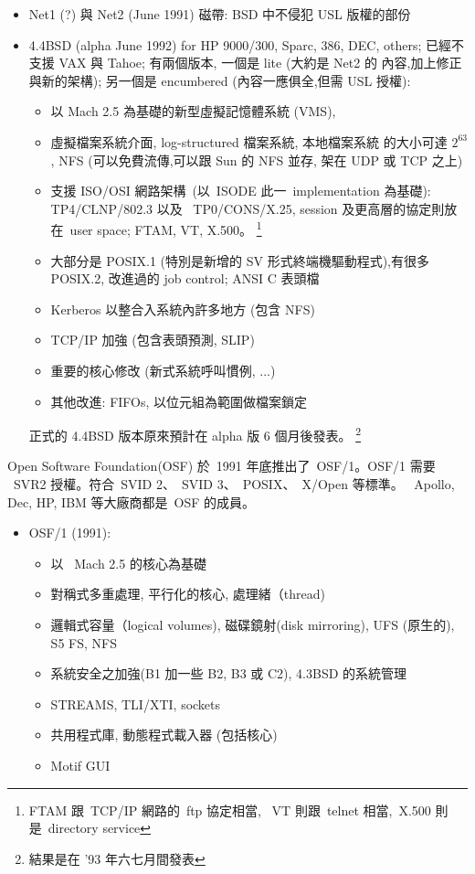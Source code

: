 \documentclass{article}
\begin{document}
\begin{CJK*}{Bg5}{ming}
\begin{itemize}
         \item Net1 (?) 與 Net2 (June 1991) 磁帶: BSD 中不侵犯 USL 版權的部份

         \item 4.4BSD (alpha June 1992) for HP 9000/300, Sparc, 386, DEC, others;
           已經不支援 VAX 與 Tahoe; 有兩個版本, 一個是 lite (大約是 Net2 的
           內容,加上修正與新的架構); 另一個是 encumbered (內容一應俱全,但需
           USL 授權):
	   \begin{itemize}
           \item 以 Mach 2.5 為基礎的新型虛擬記憶體系統 (VMS),
           \item 虛擬檔案系統介面, log-structured 檔案系統, 本地檔案系統
             的大小可達 $2^63$, NFS (可以免費流傳,可以跟 Sun 的 NFS 並存,
             架在 UDP 或 TCP 之上)
           \item 支援 ISO/OSI 網路架構~(以~ISODE 此一~implementation 為基礎): TP4/CLNP/802.3 以及
             ~TP0/CONS/X.25, session 及更高層的協定則放在~user space;
             FTAM, VT, X.500。
	     \footnote{FTAM 跟~TCP/IP 網路的~ftp 協定相當,
                      ~VT 則跟~telnet 相當,~X.500 則是~directory service}

           \item 大部分是 POSIX.1 (特別是新增的 SV 形式終端機驅動程式),有很多
             POSIX.2, 改進過的 job control; ANSI C 表頭檔
           \item Kerberos 以整合入系統內許多地方 (包含 NFS)
           \item TCP/IP 加強 (包含表頭預測, SLIP)
           \item 重要的核心修改 (新式系統呼叫慣例, ...)
           \item 其他改進: FIFOs, 以位元組為範圍做檔案鎖定
	   \end{itemize}
           正式的 4.4BSD 版本原來預計在 alpha 版 6 個月後發表。
           \footnote{結果是在 '93 年六七月間發表}
\end{itemize}

    Open Software Foundation(OSF) 於~1991 年底推出了~OSF/1。OSF/1 需要 
    ~SVR2 授權。符合~SVID 2、~SVID 3、~POSIX、~X/Open 等標準。
    ~Apollo, Dec, HP, IBM 等大廠商都是~OSF 的成員。
\begin{itemize}
         \item OSF/1 (1991):
	 \begin{itemize}
           \item 以 ~Mach 2.5 的核心為基礎
           \item 對稱式多重處理, 平行化的核心, 處理緒（thread)
           \item 邏輯式容量（logical volumes), 磁碟鏡射(disk mirroring),
             UFS (原生的), S5 FS, NFS
           \item 系統安全之加強(B1 加一些 B2, B3 或 C2), 4.3BSD 的系統管理
           \item STREAMS, TLI/XTI, sockets
           \item 共用程式庫, 動態程式載入器 (包括核心)
           \item Motif GUI
	 \end{itemize}


\end{itemize}
\end{CJK*}
\end{document}

